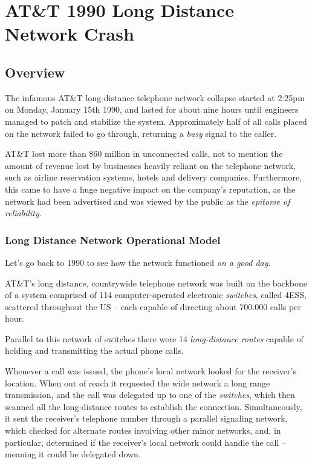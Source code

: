 \documentclass[compilation.tex]{subfiles}
\newcommand*{\att}{AT\&T}
\begin{document}
\section{\att{} 1990 Long Distance Network Crash}

\subsection{Overview}

The infamous \att{} long-distance telephone network collapse started at 2:25pm on Monday, January 15th 1990, and lasted for about nine hours until engineers managed to patch and stabilize the system.\supercite{att-dennisburke1995}
Approximately half of all calls placed on the network failed to go through, returning a \emph{busy} signal to the caller.

\att{} lost more than \$60 million in unconnected calls, not to mention the amount of revenue lost by businesses heavily reliant on the telephone network, such as airline reservation systems, hotels and delivery companies. Furthermore, this came to have a huge negative impact on the company's reputation, as the network had been advertised and was viewed by the public as the \textsl{epitome of reliability}.\supercite{att-popularscience1990}

\subsubsection{Long Distance Network Operational Model}

Let's go back to 1990 to see how the network functioned \textsl{on a good day}.

\att{}'s long distance, countrywide telephone network was built on the backbone of a system comprised of 114 computer-operated electronic \emph{switches}, called 4ESS, scattered throughout the US -- each capable of directing about 700.000 calls per hour.

Parallel to this network of switches there were 14 \emph{long-distance routes} capable of holding and transmitting the actual phone calls.\supercite{att-dennisburke1995}

Whenever a call was issued, the phone's local network looked for the receiver's location.
When out of reach it requested the wide network a long range transmission, and the call was delegated up to one of the \emph{switches}, which then scanned all the long-distance routes to establish the connection.
Simultaneously, it sent the receiver's telephone number through a parallel signaling network, which checked for alternate routes involving other minor networks, and, in particular, determined if the receiver's local network could handle the call -- meaning it could be delegated down.
\end{document}
